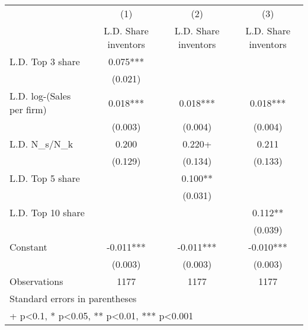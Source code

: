 {
\def\sym#1{\ifmmode^{#1}\else\(^{#1}\)\fi}
\begin{tabular}{l*{3}{c}}
\hline\hline
                    &\multicolumn{1}{c}{(1)}&\multicolumn{1}{c}{(2)}&\multicolumn{1}{c}{(3)}\\
                    &\multicolumn{1}{c}{L.D. Share inventors }&\multicolumn{1}{c}{L.D. Share inventors }&\multicolumn{1}{c}{L.D. Share inventors }\\
\hline
L.D. Top 3 share    &       0.075***&               &               \\
                    &     (0.021)   &               &               \\
[1em]
L.D. log-(Sales per firm) &       0.018***&       0.018***&       0.018***\\
                    &     (0.003)   &     (0.004)   &     (0.004)   \\
[1em]
L.D. N\_s/N\_k        &       0.200   &       0.220+  &       0.211   \\
                    &     (0.129)   &     (0.134)   &     (0.133)   \\
[1em]
L.D. Top 5 share    &               &       0.100** &               \\
                    &               &     (0.031)   &               \\
[1em]
L.D. Top 10 share   &               &               &       0.112** \\
                    &               &               &     (0.039)   \\
[1em]
Constant            &      -0.011***&      -0.011***&      -0.010***\\
                    &     (0.003)   &     (0.003)   &     (0.003)   \\
\hline
Observations        &        1177   &        1177   &        1177   \\
\hline\hline
\multicolumn{4}{l}{\footnotesize Standard errors in parentheses}\\
\multicolumn{4}{l}{\footnotesize + p<0.1, * p<0.05, ** p<0.01, *** p<0.001}\\
\end{tabular}
}
